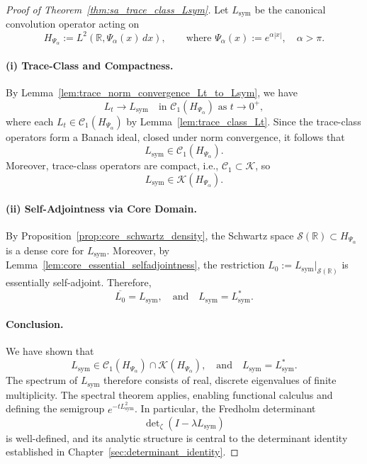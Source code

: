 \begin{proof}[Proof of Theorem~\ref{thm:sa_trace_class_Lsym}]
Let \( L_{\mathrm{sym}} \) be the canonical convolution operator acting on
\[
H_{\Psi_\alpha} := L^2(\mathbb{R}, \Psi_\alpha(x)\, dx), \qquad \text{where } \Psi_\alpha(x) := e^{\alpha |x|}, \quad \alpha > \pi.
\]

\paragraph{(i) Trace-Class and Compactness.}
By Lemma~\ref{lem:trace_norm_convergence_Lt_to_Lsym}, we have
\[
L_t \to L_{\mathrm{sym}} \quad \text{in } \mathcal{C}_1(H_{\Psi_\alpha}) \text{ as } t \to 0^+,
\]
where each \( L_t \in \mathcal{C}_1(H_{\Psi_\alpha}) \) by Lemma~\ref{lem:trace_class_Lt}. Since the trace-class operators form a Banach ideal, closed under norm convergence, it follows that
\[
L_{\mathrm{sym}} \in \mathcal{C}_1(H_{\Psi_\alpha}).
\]
Moreover, trace-class operators are compact, i.e., \( \mathcal{C}_1 \subset \mathcal{K} \), so
\[
L_{\mathrm{sym}} \in \mathcal{K}(H_{\Psi_\alpha}).
\]

\paragraph{(ii) Self-Adjointness via Core Domain.}
By Proposition~\ref{prop:core_schwartz_density}, the Schwartz space \( \mathcal{S}(\mathbb{R}) \subset H_{\Psi_\alpha} \) is a dense core for \( L_{\mathrm{sym}} \). Moreover, by Lemma~\ref{lem:core_essential_selfadjointness}, the restriction \( L_0 := L_{\mathrm{sym}}|_{\mathcal{S}(\mathbb{R})} \) is essentially self-adjoint. Therefore,
\[
\overline{L_0} = L_{\mathrm{sym}}, \quad \text{and} \quad L_{\mathrm{sym}} = L_{\mathrm{sym}}^*.
\]

\paragraph{Conclusion.}
We have shown that
\[
L_{\mathrm{sym}} \in \mathcal{C}_1(H_{\Psi_\alpha}) \cap \mathcal{K}(H_{\Psi_\alpha}), \quad \text{and} \quad L_{\mathrm{sym}} = L_{\mathrm{sym}}^*.
\]
The spectrum of \( L_{\mathrm{sym}} \) therefore consists of real, discrete eigenvalues of finite multiplicity. The spectral theorem applies, enabling functional calculus and defining the semigroup \( e^{-t L_{\mathrm{sym}}^2} \). In particular, the Fredholm determinant
\[
\det\nolimits_\zeta(I - \lambda L_{\mathrm{sym}})
\]
is well-defined, and its analytic structure is central to the determinant identity established in Chapter~\ref{sec:determinant_identity}.
\end{proof}
% 
